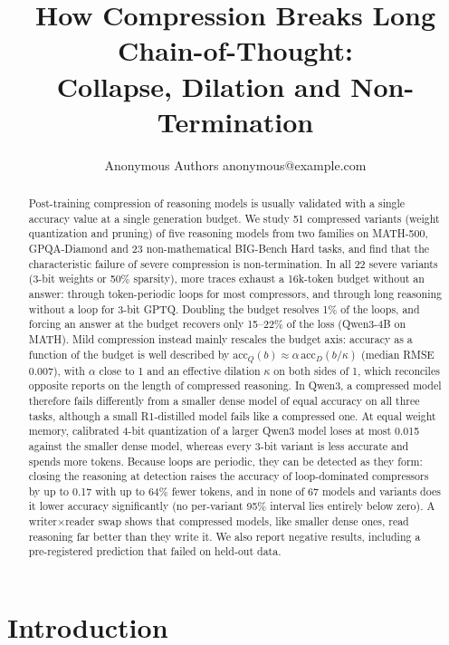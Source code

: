 \documentclass[10pt]{article}
\title{How Compression Breaks Long Chain-of-Thought:\\Collapse, Dilation and Non-Termination}
\author{\name Anonymous Authors \email anonymous@example.com}
\newcommand{\acc}{\mathrm{acc}}
\begin{document}
\maketitle

\begin{abstract}
Post-training compression of reasoning models is usually validated with a single accuracy value at a single generation budget. We study 51 compressed variants (weight quantization and pruning) of five reasoning models from two families on MATH-500, GPQA-Diamond and 23 non-mathematical BIG-Bench Hard tasks, and find that the characteristic failure of severe compression is non-termination. In all 22 severe variants (3-bit weights or 50\% sparsity), more traces exhaust a 16k-token budget without an answer: through token-periodic loops for most compressors, and through long reasoning without a loop for 3-bit GPTQ. Doubling the budget resolves 1\% of the loops, and forcing an answer at the budget recovers only 15--22\% of the loss (Qwen3-4B on MATH). Mild compression instead mainly rescales the budget axis: accuracy as a function of the budget is well described by $\acc_Q(b)\approx\alpha\,\acc_D(b/\kappa)$ (median RMSE 0.007), with $\alpha$ close to 1 and an effective dilation $\kappa$ on both sides of 1, which reconciles opposite reports on the length of compressed reasoning. In Qwen3, a compressed model therefore fails differently from a smaller dense model of equal accuracy on all three tasks, although a small R1-distilled model fails like a compressed one. At equal weight memory, calibrated 4-bit quantization of a larger Qwen3 model loses at most 0.015 against the smaller dense model, whereas every 3-bit variant is less accurate and spends more tokens. Because loops are periodic, they can be detected as they form: closing the reasoning at detection raises the accuracy of loop-dominated compressors by up to 0.17 with up to 64\% fewer tokens, and in none of 67 models and variants does it lower accuracy significantly (no per-variant 95\% interval lies entirely below zero). A writer$\times$reader swap shows that compressed models, like smaller dense ones, read reasoning far better than they write it. We also report negative results, including a pre-registered prediction that failed on held-out data.
\end{abstract}

\section{Introduction}
\end{document}
